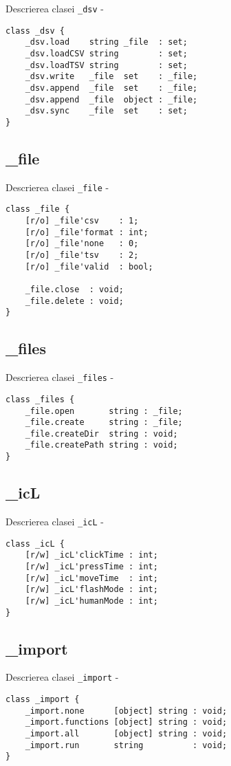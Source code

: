 \noindent Descrierea clasei \texttt{\_dsv} -
\begin{verbatim}
class _dsv {
	_dsv.load    string _file  : set;
	_dsv.loadCSV string        : set;
	_dsv.loadTSV string        : set;
	_dsv.write   _file  set    : _file;
	_dsv.append  _file  set    : _file;
	_dsv.append  _file  object : _file;
	_dsv.sync    _file  set    : set;
}
\end{verbatim}

\subsection{{\color{orange} \_file}}

\noindent Descrierea clasei \texttt{\_file} -
\begin{verbatim}
class _file {
	[r/o] _file'csv    : 1;
	[r/o] _file'format : int;
	[r/o] _file'none   : 0;
	[r/o] _file'tsv    : 2;
	[r/o] _file'valid  : bool;
	
	_file.close  : void;
	_file.delete : void;
}
\end{verbatim}

\subsection{{\color{orange} \_files}}

\noindent Descrierea clasei \texttt{\_files} -
\begin{verbatim}
class _files {
	_file.open       string : _file;
	_file.create     string : _file;
	_file.createDir  string : void;
	_file.createPath string : void;
}
\end{verbatim}

\subsection{{\color{orange} \_icL}}

\noindent Descrierea clasei \texttt{\_icL} -
\begin{verbatim}
class _icL {
	[r/w] _icL'clickTime : int;
	[r/w] _icL'pressTime : int;
	[r/w] _icL'moveTime  : int;
	[r/w] _icL'flashMode : int;
	[r/w] _icL'humanMode : int;
}
\end{verbatim}

\subsection{{\color{orange} \_import}}

\noindent Descrierea clasei \texttt{\_import} -
\begin{verbatim}
class _import {
	_import.none      [object] string : void;
	_import.functions [object] string : void;
	_import.all       [object] string : void;
	_import.run       string          : void;
}
\end{verbatim}

